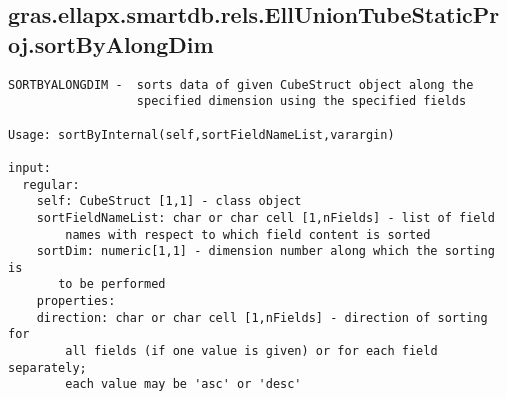 \subsection{\texorpdfstring{gras.ellapx.smartdb.rels.EllUnionTubeStaticProj.sortByAlongDim}{sortByAlongDim}}\label{method:gras.ellapx.smartdb.rels.EllUnionTubeStaticProj.sortByAlongDim}
\begin{verbatim}
SORTBYALONGDIM -  sorts data of given CubeStruct object along the
                  specified dimension using the specified fields

Usage: sortByInternal(self,sortFieldNameList,varargin)

input:
  regular:
    self: CubeStruct [1,1] - class object
    sortFieldNameList: char or char cell [1,nFields] - list of field
        names with respect to which field content is sorted
    sortDim: numeric[1,1] - dimension number along which the sorting is
       to be performed
    properties:
    direction: char or char cell [1,nFields] - direction of sorting for
        all fields (if one value is given) or for each field separately;
        each value may be 'asc' or 'desc'
\end{verbatim}
